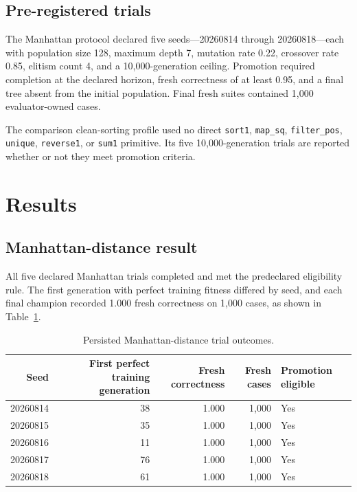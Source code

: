 \documentclass[11pt]{article}
\begin{document}
\subsection{Pre-registered trials}

The Manhattan protocol declared five seeds---20260814 through 20260818---each with population size 128, maximum depth 7, mutation rate 0.22, crossover rate 0.85, elitism count 4, and a 10,000-generation ceiling. Promotion required completion at the declared horizon, fresh correctness of at least 0.95, and a final tree absent from the initial population. Final fresh suites contained 1,000 evaluator-owned cases.

The comparison clean-sorting profile used no direct \texttt{sort1}, \texttt{map\_sq}, \texttt{filter\_pos}, \texttt{unique}, \texttt{reverse1}, or \texttt{sum1} primitive. Its five 10,000-generation trials are reported whether or not they meet promotion criteria.

\section{Results}

\subsection{Manhattan-distance result}

All five declared Manhattan trials completed and met the predeclared eligibility rule. The first generation with perfect training fitness differed by seed, and each final champion recorded 1.000 fresh correctness on 1,000 cases, as shown in Table~\ref{tab:manhattan}.

\begin{table}[ht]
\centering
\caption{Persisted Manhattan-distance trial outcomes.}
\label{tab:manhattan}
\begin{tabular}{rrrrl}
\toprule
Seed & First perfect training generation & Fresh correctness & Fresh cases & Promotion eligible \\
\midrule
20260814 & 38 & 1.000 & 1,000 & Yes \\
20260815 & 35 & 1.000 & 1,000 & Yes \\
20260816 & 11 & 1.000 & 1,000 & Yes \\
20260817 & 76 & 1.000 & 1,000 & Yes \\
20260818 & 61 & 1.000 & 1,000 & Yes \\
\bottomrule
\end{tabular}
\end{table}
\end{document}
